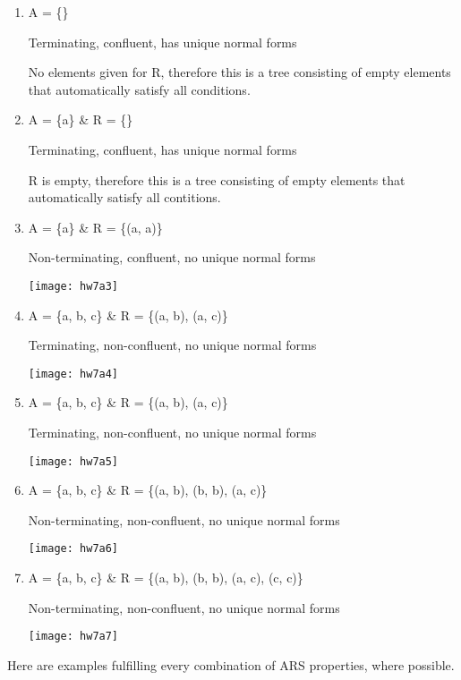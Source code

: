 \documentclass{article}
\theoremstyle{theorem}
\theoremstyle{definition}
\theoremstyle{remark}
\begin{document}
\begin{enumerate}
\item {A = \{\}

Terminating, confluent, has unique normal forms

No elements given for R, therefore this is a tree consisting of empty elements that automatically satisfy all conditions.}
\item {A = \{a\} \& R = \{\}

Terminating, confluent, has unique normal forms

R is empty, therefore this is a tree consisting of empty elements that automatically satisfy all contitions.}
\item {A = \{a\} \& R = \{(a, a)\}

Non-terminating, confluent, no unique normal forms

\texttt{[image: hw7a3]}}
\item {A = \{a, b, c\} \& R = \{(a, b), (a, c)\}

Terminating, non-confluent, no unique normal forms

\texttt{[image: hw7a4]}}
\item {A = \{a, b, c\} \& R = \{(a, b), (a, c)\}

Terminating, non-confluent, no unique normal forms

\texttt{[image: hw7a5]}}
\item {A = \{a, b, c\} \& R = \{(a, b), (b, b), (a, c)\}

Non-terminating, non-confluent, no unique normal forms

\texttt{[image: hw7a6]}}
\item {A = \{a, b, c\} \& R = \{(a, b), (b, b), (a, c), (c, c)\}

Non-terminating, non-confluent, no unique normal forms

\texttt{[image: hw7a7]}}
\end{enumerate}
%
Here are examples fulfilling every combination of ARS properties, where possible.
\end{document}

